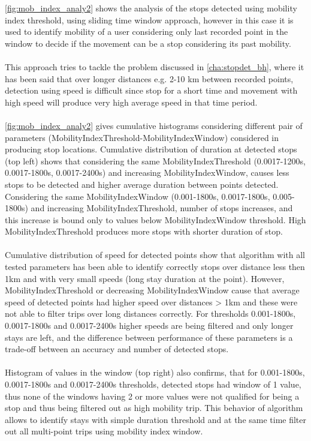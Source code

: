 \autoref{fig:mob_index_analy2} shows the analysis of the stops detected using mobility index threshold, using sliding time window approach, however in this case it is used to identify mobility of a user considering only last recorded point in the window to decide if the movement can be a stop considering its past mobility.
\\\\
This approach tries to tackle the problem discussed in \autoref{cha:stopdet_bh}, where it has been said that over longer distances e.g. 2-10 km between recorded points, detection using speed is difficult since stop for a short time and movement with high speed will produce very high average speed in that time period. 
\\\\
\autoref{fig:mob_index_analy2} gives cumulative histograms considering different pair of parameters (MobilityIndexThreshold-MobilityIndexWindow) considered in producing stop locations. Cumulative distribution of duration at detected stops (top left) shows that considering the same MobilityIndexThreshold (0.0017-1200s, 0.0017-1800s, 0.0017-2400s) and increasing MobilityIndexWindow, causes less stops to be detected and higher average duration between points detected. Considering the same MobilityIndexWindow (0.001-1800s, 0.0017-1800s, 0.005-1800s) and increasing MobilityIndexThreshold, number of stops increases, and this increase is bound only to values below MobilityIndexWindow threshold. High MobilityIndexThreshold produces more stops with shorter duration of stop. 
\\\\
Cumulative distribution of speed for detected points show that algorithm with all tested parameters has been able to identify correctly stops over distance less then 1km and with very small speeds (long stay duration at the point). However, MobilityIndexThreshold or decreasing MobilityIndexWindow cause that average speed of detected points had higher speed over distances > 1km and these were not able to filter trips over long distances correctly. For thresholds 0.001-1800s, 0.0017-1800s and 0.0017-2400s higher speeds are being filtered and only longer stays are left, and the difference between performance of these parameters is a trade-off between an accuracy and number of detected stops. 
\\\\
Histogram of values in the window (top right) also confirms, that for 0.001-1800s, 0.0017-1800s and 0.0017-2400s thresholds, detected stops had window of 1 value, thus none of the windows having 2 or more values were not qualified for being a stop and thus being filtered out as high mobility trip. This behavior of algorithm allows to identify stays with simple duration threshold and at the same time filter out all multi-point trips using mobility index window. 

